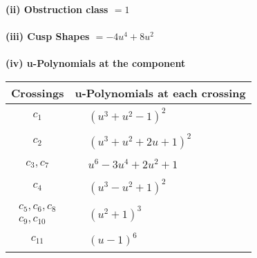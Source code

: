 \documentclass[1p]{elsarticle_modified}
\theoremstyle{definition}
\begin{document}
\flushleft \textbf{(ii) Obstruction class $= 1$}\\~\\
\flushleft \textbf{(iii) Cusp Shapes $= -4 u^4+8 u^2$}\\~\\
\newpage\renewcommand{\arraystretch}{1}
\flushleft \textbf{(iv) u-Polynomials at the component}\newline \\
\begin{tabular}{m{50pt}|m{274pt}}
Crossings & \hspace{64pt}u-Polynomials at each crossing \\
\hline $$\begin{aligned}c_{1}\end{aligned}$$&$\begin{aligned}
&(u^3+u^2-1)^2
\end{aligned}$\\
\hline $$\begin{aligned}c_{2}\end{aligned}$$&$\begin{aligned}
&(u^3+u^2+2 u+1)^2
\end{aligned}$\\
\hline $$\begin{aligned}c_{3},c_{7}\end{aligned}$$&$\begin{aligned}
&u^6-3 u^4+2 u^2+1
\end{aligned}$\\
\hline $$\begin{aligned}c_{4}\end{aligned}$$&$\begin{aligned}
&(u^3- u^2+1)^2
\end{aligned}$\\
\hline $$\begin{aligned}c_{5},c_{6},c_{8}\\c_{9},c_{10}\end{aligned}$$&$\begin{aligned}
&(u^2+1)^3
\end{aligned}$\\
\hline $$\begin{aligned}c_{11}\end{aligned}$$&$\begin{aligned}
&(u-1)^6
\end{aligned}$\\
\hline
\end{tabular}\\~\\
\end{document}
